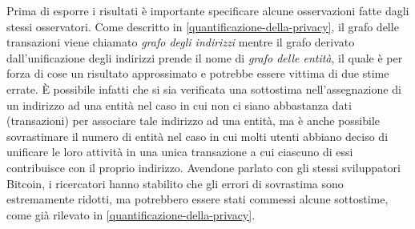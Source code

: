 Prima di esporre i risultati è importante specificare alcune osservazioni fatte dagli stessi osservatori. Come descritto in \ref{quantificazione-della-privacy}, il grafo delle transazioni viene chiamato \emph{grafo degli indirizzi} mentre il grafo derivato dall'unificazione degli indirizzi prende il nome di \emph{grafo delle entità}, il quale è per forza di cose un risultato approssimato e potrebbe essere vittima di due stime errate. È possibile infatti che si sia verificata una sottostima nell'assegnazione di un indirizzo ad una entità nel caso in cui non ci siano abbastanza dati (transazioni) per associare tale indirizzo ad una entità, ma è anche possibile sovrastimare il numero di entità nel caso in cui molti utenti abbiano deciso di unificare le loro attività in una unica transazione a cui ciascuno di essi contribuisce con il proprio indirizzo. Avendone parlato con gli stessi sviluppatori Bitcoin, i ricercatori hanno stabilito che gli errori di sovrastima sono estremamente ridotti, ma potrebbero essere stati commessi alcune sottostime, come già rilevato in \ref{quantificazione-della-privacy}.\\

